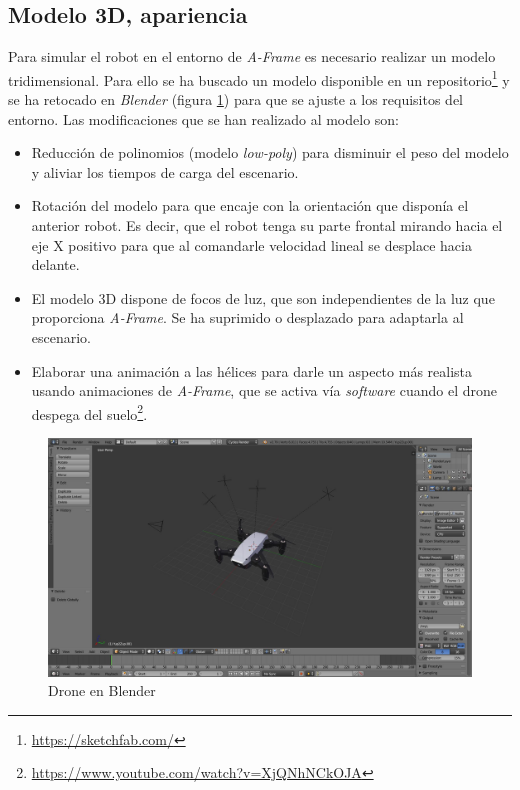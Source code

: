 \subsection{Modelo 3D, apariencia}

Para simular el robot en el entorno de \textit{A-Frame} es necesario realizar un modelo tridimensional. Para ello se ha buscado un modelo disponible en un repositorio\footnote{\url{https://sketchfab.com/}} y se ha retocado en \textit{Blender} (figura \ref{fig:droneBlender}) para que se ajuste a los requisitos del entorno. Las modificaciones que se han realizado al modelo son: 
\begin{itemize}
    \item Reducción de polinomios (modelo \textit{low-poly}) para disminuir el peso del modelo y aliviar los tiempos de carga del escenario.
    \item Rotación del modelo para que encaje con la orientación que disponía el anterior robot. Es decir, que el robot tenga su parte frontal mirando hacia el eje X positivo para que al comandarle velocidad lineal se desplace hacia delante.
    \item El modelo 3D dispone de focos de luz, que son independientes de la luz que proporciona \textit{A-Frame}. Se ha suprimido o desplazado para adaptarla al escenario.
    
    \item Elaborar una animación a las hélices para darle un aspecto más realista usando animaciones de \textit{A-Frame}, que se activa vía \textit{software} cuando el drone despega del suelo\footnote{\url{https://www.youtube.com/watch?v=XjQNhNCkOJA}}.
    
\end{itemize}

 \begin{figure}[H]
    \centering
    \includegraphics[scale=0.3]{img/droneBlender.jpg}
    \caption{Drone en Blender} \label{fig:droneBlender}
\end{figure}


